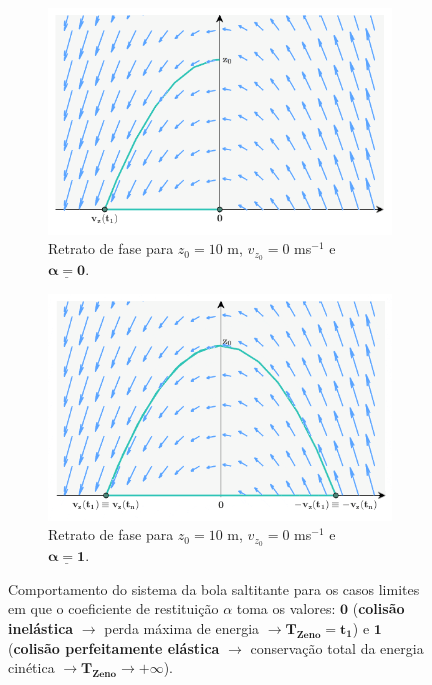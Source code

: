 \vspace{-1.25em}
\begin{figure}[ht] 
    \begin{subfigure}[b]{0.5\linewidth}
        \centering
        \includegraphics[width=1\linewidth]{img/P1/P1-PhasePortrait-alpha=0.png}
        \caption{Retrato de fase para $z_0 = 10$ m, $v_{z_0} = 0$ ms$^{-1}$ e\\ $\pmb{\underline{\alpha = 0}}$.} 
        \label{fig:phase-portrait-alpha0} 
    \end{subfigure}%
    \begin{subfigure}[b]{0.5\linewidth}
        \centering
        \includegraphics[width=1\linewidth]{img/P1/P1-PhasePortrait-alpha=1.png} 
        \caption{Retrato de fase para $z_0 = 10$ m, $v_{z_0} = 0$ ms$^{-1}$ e\\ $\pmb{\underline{\alpha = 1}}$.} 
        \label{fig:phase-portrait-alpha1} 
    \end{subfigure} 
    \caption{Comportamento do sistema da bola saltitante para os casos limites em que o coeficiente de restituição $\alpha$ toma os valores: $\pmb{0}$ (\textbf{colisão inelástica} $\rightarrow$ perda máxima de energia $\rightarrow \pmb{T_{Zeno} = t_1}$) e $\pmb{1}$ (\textbf{colisão perfeitamente elástica} $\rightarrow$ conservação total da energia cinética $\rightarrow \pmb{T_{Zeno} \to +\infty}$).}
    \label{fig:phase-portrait-limites}
\end{figure}


